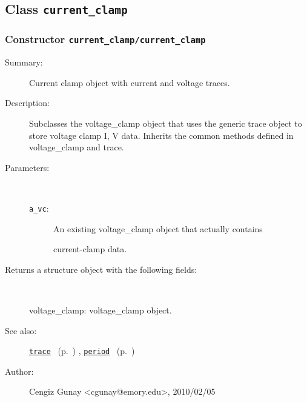 \subsection{Class \texttt{current\_clamp}}%
%
\label{ref_current_clamp}%
\hypertarget{ref_current_clamp}{}%
\subsubsection[Constructor \texttt{current\_clamp}]{Constructor \texttt{current\_clamp/current\_clamp}}%
%
\label{ref_current_clamp__current_clamp}%
\hypertarget{ref_current_clamp__current_clamp}{}%
\begin{description}
\item[Summary:]Current clamp object with current and voltage traces.
%
%
\item[Description:]%
Subclasses the voltage\_clamp object that uses the generic trace object
 to store voltage clamp I, V data. Inherits the common methods defined
 in voltage\_clamp and trace.
\item[Parameters:]~
\begin{description}%
\item[\texttt{a\_vc}:]
 An existing voltage\_clamp object that actually contains

current-clamp data.
\end{description}%
%
\item[Returns a structure object with the following fields:
]~

   voltage\_clamp: voltage\_clamp object.
%
%
\item[See also:]%
\hyperlink{ref_trace}{\texttt{trace}}%
\ (p.~\pageref{ref_trace})%
%
, \hyperlink{ref_period}{\texttt{period}}%
\ (p.~\pageref{ref_period})%
%
%
\item[Author:]%
Cengiz Gunay <cgunay@emory.edu>, 2010/02/05
%
\end{description}
\methodline%
